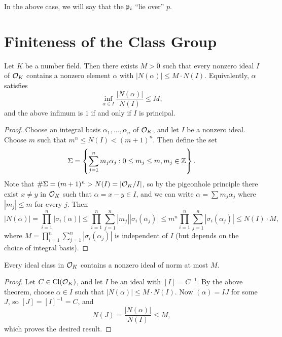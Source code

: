 \begin{remark}
  In the above case, we will say that the
  $\mathfrak{p}_i$ ``lie over'' $p$.
\end{remark}

\section{Finiteness of the Class Group}
\begin{theorem}
  Let $K$ be a number field. Then there exists $M > 0$
  such that every nonzero ideal $I$ of $\mathcal{O}_K$ contains
  a nonzero element $\alpha$ with
  $|N(\alpha)| \le M \cdot N(I)$. Equivalently,
  $\alpha$ satisfies
  \[
    \inf_{\alpha \in I} \frac{|N(\alpha)|}{N(I)} \le M,
  \]
  and the above infimum is $1$ if and only if $I$ is
  principal.
\end{theorem}

\begin{proof}
  Choose an integral basis $\alpha_1, \dots, \alpha_n$
  of $\mathcal{O}_K$, and let $I$ be a nonzero ideal.
  Choose $m$ such that $m^n \le N(I) < (m + 1)^n$.
  Then define the set
  \[
    \Sigma =
    \left\{
      \sum_{j = 1}^n m_j \alpha_j : 0 \le m_j \le m, m_j \in \mathbb{Z}
    \right\}.
  \]
  Note that $\# \Sigma = (m + 1)^n > N(I) = |\mathcal{O}_K / I|$,
  so by the pigeonhole principle there exist $x \ne y$
  in $\mathcal{O}_K$ such that $\alpha = x - y \in I$, and
  we can write $\alpha = \sum m_j \alpha_j$ where
  $|m_j| \le m$ for every $j$. Then
  \[
    |N(\alpha)| = \prod_{i = 1}^n |\sigma_i(\alpha)|
    \le \prod_{i = 1}^n \sum_{j = 1}^n |m_j| |\sigma_i(\alpha_j)|
    \le m^n \prod_{i = 1}^n \sum_{j = 1}^n |\sigma_i(\alpha_j)|
    \le N(I) \cdot M,
  \]
  where $M = \prod_{i = 1}^n \sum_{j = 1}^n |\sigma_i(\alpha_j)|$
  is independent of $I$ (but depends on the
  choice of integral basis).
\end{proof}

\begin{corollary}
  Every ideal class in $\mathcal{O}_K$ contains a nonzero
  ideal of norm at most $M$.
\end{corollary}

\begin{proof}
  Let $C \in \operatorname{Cl}(\mathcal{O}_K)$, and let $I$ be an ideal
  with $[I] = C^{-1}$. By the above theorem,
  choose $\alpha \in I$ such that $|N(\alpha)| \le M \cdot N(I)$.
  Now $(\alpha) = IJ$ for some $J$, so
  $[J] = [I]^{-1} = C$, and
  \[
    N(J) = \frac{|N(\alpha)|}{N(I)} \le M,
  \]
  which proves the desired result.
\end{proof}

